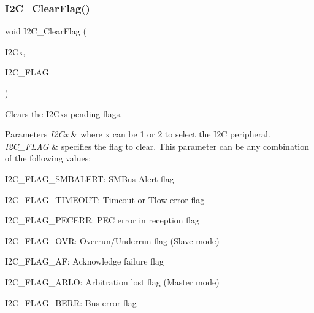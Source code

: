 \subsubsection{\texorpdfstring{I2\+C\+\_\+\+Clear\+Flag()}{I2C\_ClearFlag()}}
{\footnotesize\ttfamily void I2\+C\+\_\+\+Clear\+Flag (\begin{DoxyParamCaption}\item[{\hyperlink{struct_i2_c___type_def}{I2\+C\+\_\+\+Type\+Def} $\ast$}]{I2\+Cx,  }\item[{uint32\+\_\+t}]{I2\+C\+\_\+\+F\+L\+AG }\end{DoxyParamCaption})}



Clears the I2\+Cx\textquotesingle{}s pending flags. 


\begin{DoxyParams}{Parameters}
{\em I2\+Cx} & where x can be 1 or 2 to select the I2C peripheral. \\
\hline
{\em I2\+C\+\_\+\+F\+L\+AG} & specifies the flag to clear. This parameter can be any combination of the following values\+: \begin{DoxyItemize}
\item I2\+C\+\_\+\+F\+L\+A\+G\+\_\+\+S\+M\+B\+A\+L\+E\+RT\+: S\+M\+Bus Alert flag \item I2\+C\+\_\+\+F\+L\+A\+G\+\_\+\+T\+I\+M\+E\+O\+UT\+: Timeout or Tlow error flag \item I2\+C\+\_\+\+F\+L\+A\+G\+\_\+\+P\+E\+C\+E\+RR\+: P\+EC error in reception flag \item I2\+C\+\_\+\+F\+L\+A\+G\+\_\+\+O\+VR\+: Overrun/\+Underrun flag (Slave mode) \item I2\+C\+\_\+\+F\+L\+A\+G\+\_\+\+AF\+: Acknowledge failure flag \item I2\+C\+\_\+\+F\+L\+A\+G\+\_\+\+A\+R\+LO\+: Arbitration lost flag (Master mode) \item I2\+C\+\_\+\+F\+L\+A\+G\+\_\+\+B\+E\+RR\+: Bus error flag\end{DoxyItemize}
\\
\hline
\end{DoxyParams}
